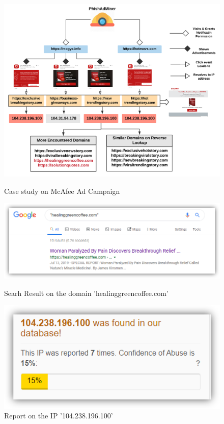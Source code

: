 \begin{figure}[ht]
\begin{center}
 \includegraphics[width=\linewidth]{figs/mcafee_case2.pdf}
        \caption{Case study on McAfee Ad Campaign}
        \label{McAfee_case}
\end{center}
\begin{center}
 \includegraphics[width=\linewidth]{figs/healinggreencoffee.png}
        \caption{Searh Result on the domain 'healinggreencoffee.com'}
        \label{google_res}
\end{center}
\begin{center}
 \includegraphics[width=\linewidth]{figs/ip_report.png}
        \caption{Report on the IP '104.238.196.100'}
        \label{ip_report}
\end{center}
\end{figure}

